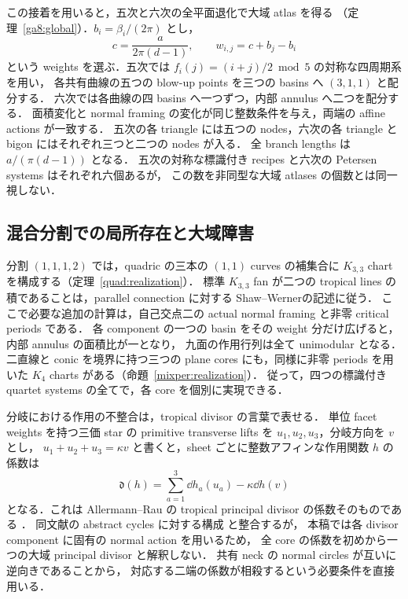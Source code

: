 この接着を用いると，五次と六次の全平面退化で大域 atlas を得る
（定理~\ref{ga8:global}）．$b_i=\beta_i/(2\pi)$ とし，
\[
 c=\frac{a}{2\pi(d-1)},\qquad w_{i,j}=c+b_j-b_i
\]
という weights を選ぶ．五次では $f_i(j)=(i+j)/2\bmod5$ の対称な四周期系を用い，
各共有曲線の五つの blow-up points を三つの basins へ $(3,1,1)$ と配分する．
六次では各曲線の四 basins へ一つずつ，内部 annulus へ二つを配分する．
面積変化と normal framing の変化が同じ整数条件を与え，両端の affine actions が一致する．
五次の各 triangle には五つの nodes，六次の各 triangle と bigon にはそれぞれ三つと二つの nodes が入る．
全 branch lengths は $a/(\pi(d-1))$ となる．
五次の対称な標識付き recipes と六次の Petersen systems はそれぞれ六個あるが，
この数を非同型な大域 atlases の個数とは同一視しない．

\subsection{混合分割での局所存在と大域障害}

分割 $(1,1,1,2)$ では，quadric の三本の $(1,1)$ curves の補集合に
$K_{3,3}$ chart を構成する（定理~\ref{quad:realization}）．
標準 $K_{3,3}$ fan が二つの tropical lines の積であることは，parallel connection に対する
Shaw--Werner\cite[Theorem~7.2]{ShawWerner}の記述に従う．
ここで必要な追加の計算は，自己交点二の actual normal framing と非零 critical periods である．
各 component の一つの basin をその weight 分だけ広げると，内部 annulus の面積比が一となり，
九面の作用行列は全て unimodular となる．
二直線と conic を境界に持つ三つの plane cores にも，同様に非零 periods を用いた
$K_4$ charts がある（命題~\ref{mixper:realization}）．
従って，四つの標識付き quartet systems の全てで，各 core を個別に実現できる．

分岐における作用の不整合は，tropical divisor の言葉で表せる．
単位 facet weights を持つ三価 star の primitive transverse lifts を
$u_1,u_2,u_3$，分岐方向を $v$ とし，
$u_1+u_2+u_3=\kappa v$ と書くと，sheet ごとに整数アフィンな作用関数 $h$ の係数は
\[
 \mathfrak d(h)=\sum_{a=1}^3\dd h_a(u_a)-\kappa\dd h(v)
\]
となる．これは Allermann--Rau の tropical principal divisor の係数そのものである
\cite[Definition~3.4, Remark~3.5]{AllermannRau}．
同文献の abstract cycles に対する構成
\cite[Definition~6.1, Construction~6.4]{AllermannRau}と整合するが，
本稿では各 divisor component に固有の normal action を用いるため，
全 core の係数を初めから一つの大域 principal divisor と解釈しない．
共有 neck の normal circles が互いに逆向きであることから，
対応する二端の係数が相殺するという必要条件を直接用いる．

